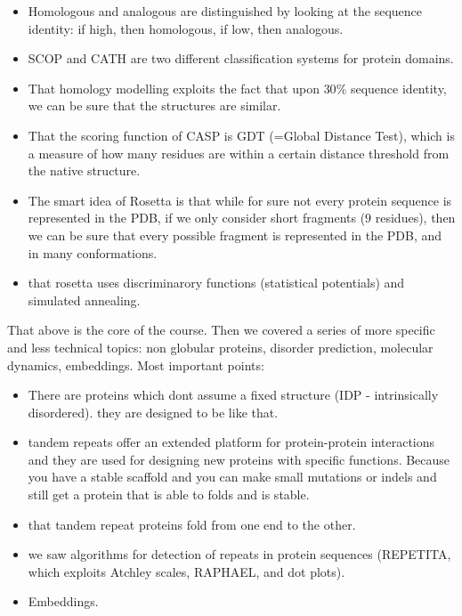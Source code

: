 \documentclass[11pt,a4paper]{article}
\begin{document}
\begin{itemize}
    \item Homologous and analogous are distinguished by looking at the sequence identity: if high, then homologous, if low, then analogous.
    \item SCOP and CATH are two different classification systems for protein domains.
    \item That homology modelling exploits the fact that upon $30\%$ sequence identity, we can be sure that the structures are similar. 
    \item That the scoring function of CASP is GDT (=Global Distance Test), which is a measure of how many residues are within a certain distance threshold from the native structure.
    \item The smart idea of Rosetta is that while for sure not every protein sequence is represented in the PDB, if we only consider short fragments ($9$ residues), then we can be sure that every possible fragment is represented in the PDB, and in many conformations.
    \item that rosetta uses discriminarory functions (statistical potentials) and simulated annealing.
\end{itemize}
\vspace*{0.5em}
That above is the core of the course. Then we covered a series of more specific and less technical topics: non globular proteins, disorder prediction, molecular dynamics, embeddings. Most important points:
\vspace*{0.5em}
\begin{itemize}
    \item There are proteins which dont assume a fixed structure (IDP - intrinsically disordered). they are designed to be like that.
    \item tandem repeats offer an extended platform for protein-protein interactions and they are used for designing new proteins with specific functions. Because you have a stable scaffold and you can make small mutations or indels and still get a protein that is able to folds and is stable.
    \item that tandem repeat proteins fold from one end to the other.
    \item we saw algorithms for detection of repeats in protein sequences (REPETITA, which exploits Atchley scales, RAPHAEL, and dot plots).
    \item Embeddings.
\end{itemize}
















\end{document}
